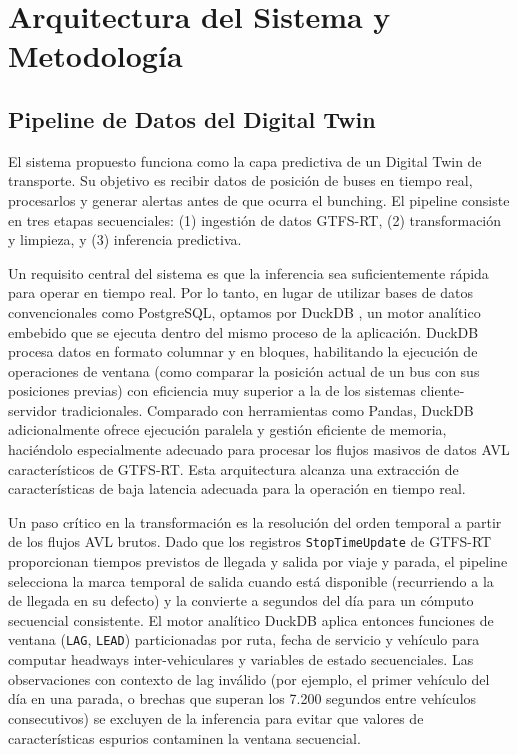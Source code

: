 \documentclass[fleqn,10pt,lineno]{wlpeerj}
\begin{document}
\section{Arquitectura del Sistema y Metodolog\'ia}
\label{sec:methodology}

\subsection{Pipeline de Datos del Digital Twin}

El sistema propuesto funciona como la capa predictiva de un Digital Twin de transporte. Su objetivo es recibir datos de posici\'on de buses en tiempo real, procesarlos y generar alertas antes de que ocurra el bunching. El pipeline consiste en tres etapas secuenciales: (1) ingesti\'on de datos GTFS-RT, (2) transformaci\'on y limpieza, y (3) inferencia predictiva.

Un requisito central del sistema es que la inferencia sea suficientemente r\'apida para operar en tiempo real. Por lo tanto, en lugar de utilizar bases de datos convencionales como PostgreSQL, optamos por DuckDB \citep{14}, un motor anal\'itico embebido que se ejecuta dentro del mismo proceso de la aplicaci\'on. DuckDB procesa datos en formato columnar y en bloques, habilitando la ejecuci\'on de operaciones de ventana (como comparar la posici\'on actual de un bus con sus posiciones previas) con eficiencia muy superior a la de los sistemas cliente-servidor tradicionales. Comparado con herramientas como Pandas, DuckDB adicionalmente ofrece ejecuci\'on paralela y gesti\'on eficiente de memoria, haci\'endolo especialmente adecuado para procesar los flujos masivos de datos AVL caracter\'isticos de GTFS-RT. Esta arquitectura alcanza una extracci\'on de caracter\'isticas de baja latencia adecuada para la operaci\'on en tiempo real.

Un paso cr\'itico en la transformaci\'on es la resoluci\'on del orden temporal a partir de los flujos AVL brutos. Dado que los registros \texttt{StopTimeUpdate} de GTFS-RT proporcionan tiempos previstos de llegada y salida por viaje y parada, el pipeline selecciona la marca temporal de salida cuando est\'a disponible (recurriendo a la de llegada en su defecto) y la convierte a segundos del d\'ia para un c\'omputo secuencial consistente. El motor anal\'itico DuckDB aplica entonces funciones de ventana (\texttt{LAG}, \texttt{LEAD}) particionadas por ruta, fecha de servicio y veh\'iculo para computar headways inter-vehiculares y variables de estado secuenciales. Las observaciones con contexto de lag inv\'alido (por ejemplo, el primer veh\'iculo del d\'ia en una parada, o brechas que superan los 7.200 segundos entre veh\'iculos consecutivos) se excluyen de la inferencia para evitar que valores de caracter\'isticas espurios contaminen la ventana secuencial.
\end{document}
